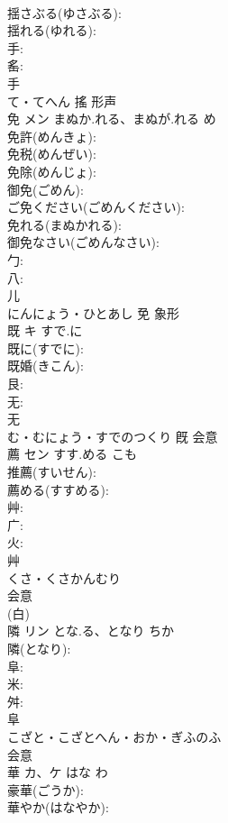 \documentclass[8pt]{extreport}
\begin{document}
\begin{CJK}{UTF8}{min}
\\	揺さぶる(ゆさぶる): 
\\	揺れる(ゆれる): 
\\	手: 
\\	䍃: 
\\	手	
\\	て・てへん	搖	形声 
\\	免	メン	まぬか.れる、まぬが.れる	め	
\\	免許(めんきょ): 
\\	免税(めんぜい): 
\\	免除(めんじょ): 
\\	御免(ごめん): 
\\	ご免ください(ごめんください): 
\\	免れる(まぬかれる): 
\\	御免なさい(ごめんなさい): 
\\	勹: 
\\	八: 
\\	儿	
\\	にんにょう・ひとあし	免	象形 
\\	既	キ	すで.に		
\\	既に(すでに): 
\\	既婚(きこん): 
\\	艮: 
\\	无: 
\\	无	
\\	む・むにょう・すでのつくり	既	会意 
\\	薦	セン	すす.める	こも	
\\	推薦(すいせん): 
\\	薦める(すすめる): 
\\	艸: 
\\	广: 
\\	火: 
\\	艸	
\\	くさ・くさかんむり	
\\	会意 
\\	(白) 
\\	隣	リン	とな.る、となり	ちか	
\\	隣(となり): 
\\	阜: 
\\	米: 
\\	舛: 
\\	阜	
\\	こざと・こざとへん・おか・ぎふのふ	
\\	会意 
\\	華	カ、ケ	はな	わ	
\\	豪華(ごうか): 
\\	華やか(はなやか): 

\end{CJK}
\end{document}
